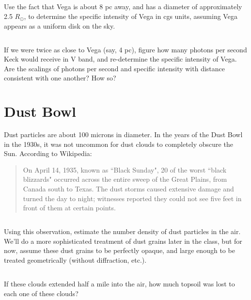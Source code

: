 \documentclass[11pt]{article}
\begin{document}
\subsection{}
Use the fact that Vega is about 8 pc away, and has a diameter of approximately 2.5 $R_\odot$, to
determine the specific intensity of Vega in cgs units, assuming Vega appears as a uniform disk on the sky.

\subsection{}
If we were twice as close to Vega (say, 4 pc), figure how many photons per second Keck would receive
in V band, and re-determine the specific intensity of Vega.  Are the scalings of photons per second and
specific intensity with distance consistent with one another?  How so?

\section{Dust Bowl}

Dust particles are about 100 microns in diameter.  In the years of the Dust
Bowl in the 1930s, it was not uncommon for dust clouds to completely obscure
the Sun.  According to Wikipedia:
\begin{quote}
On April 14, 1935, known as ``Black Sunday", 20 of the worst ``black
blizzards" occurred across the entire sweep of the Great Plains, from Canada
south to Texas. The dust storms caused extensive damage and turned the day to
night; witnesses reported they could not see five feet in front of them at
certain points.
\end{quote}

\subsection{}
Using this observation, estimate the number density of dust particles in the air.
We'll do a more sophisticated
treatment of dust grains later in the class, but for now, assume these dust grains to be perfectly
opaque, and large enough to be treated geometrically (without diffraction, etc.).

\subsection{}
If these clouds extended half a mile into the air, how much topsoil was lost to each one of these clouds?
\end{document}
